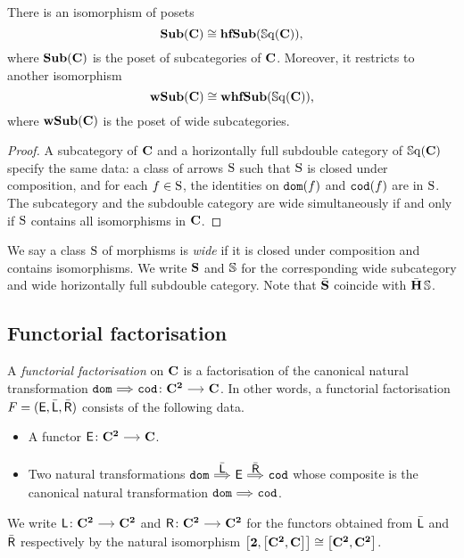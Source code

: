 \documentclass[a4paper,dvipsnames, 11pt]{amsart} %
\begin{document}
\begin{proposition}
	There is an isomorphism of posets
	\[
		\operatorname{\mathbf{Sub}}(\mathbf{C})\cong\operatorname{\mathbf{hfSub}}(\operatorname{\mathbb{S}\mathrm{q}}(\mathbf{C}))
		\text{,}
	\]
	where $\operatorname{\mathbf{Sub}}(\mathbf{C})$ is the poset of subcategories of $\mathbf{C}$.
	Moreover, it restricts to another isomorphism
	\[
		\operatorname{\mathbf{wSub}}(\mathbf{C})\cong\operatorname{\mathbf{whfSub}}(\operatorname{\mathbb{S}\mathrm{q}}(\mathbf{C}))
		\text{,}
	\]
	where $\operatorname{\mathbf{wSub}}(\mathbf{C})$ is the poset of wide subcategories.
\end{proposition}
\begin{proof}
	A subcategory of $\mathbf{C}$ and a horizontally full subdouble category of $\operatorname{\mathbb{S}\mathrm{q}}(\mathbf{C})$
	specify the same data:
	a class of arrows $\mathrm{S}$ such that $\mathrm{S}$ is closed under composition, and
	for each $f\in\mathrm{S}$, the identities on $\mathtt{dom}(f)$ and $\mathtt{cod}(f)$ are in $\mathrm{S}$.
	The subcategory and the subdouble category are wide simultaneously
	if and only if $\mathrm{S}$ contains all isomorphisms in $\mathbf{C}$.
\end{proof}
\begin{notation}
	We say a class $\mathrm{S}$ of morphisms is \emph{wide} if it is closed under composition and contains isomorphisms.
	We write $\mathbf{S}$ and $\mathbb{S}$ for the corresponding wide subcategory and wide horizontally full subdouble category.
	Note that $\bar{\mathbf{S}}$ coincide with $\operatorname{\bar{\mathbf{H}}}\mathbb{S}$.
\end{notation}

\subsection{Functorial factorisation}
\begin{definition}
	A \emph{functorial factorisation} on $\mathbf{C}$
	is a factorisation of the canonical natural transformation
	$\dom\arr[Rightarrow]\cod\colon\one{C}^\ra\arr\one{C}$.
	In other words, a functorial factorisation $F=(\mathsf{E},\bar{\mathsf{L}},\bar{\mathsf{R}})$
	consists of the following data.
	\begin{itemize}
		\item %
			A functor $\sfE\colon\one{C}^\ra\arr\one{C}$.
		\item %
			Two natural transformations
			$\dom\arr"\bar\sfL"[Rightarrow] \sfE\arr"\bar\sfR"[Rightarrow]\cod$
			whose composite is the canonical natural transformation $\dom\arr[Rightarrow]\cod$.
	\end{itemize}
	We write $\sfL\colon\one{C}^\ra\arr\one{C}^\ra$ 
	and $\sfR\colon\one{C}^\ra\arr\one{C}^\ra$ for the functors
	obtained from
	$\bar{\mathsf{L}}$ and $\bar{\mathsf{R}}$ respectively
	by
	the natural isomorphism
	$\left[\mathbf{2},\left[\mathbf{C}^{\mathbf{2}},\mathbf{C}\right]\right]\cong \left[\mathbf{C}^{\mathbf{2}},\mathbf{C}^{\mathbf{2}}\right]$.
\end{definition}



\end{document}
